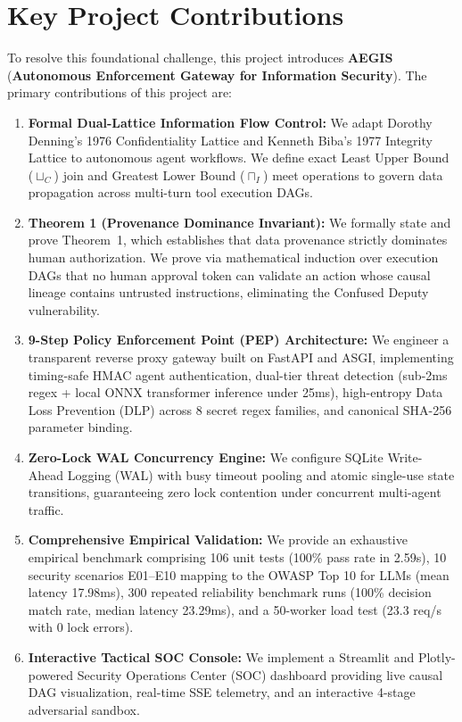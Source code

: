 \section{Key Project Contributions}
To resolve this foundational challenge, this project introduces \textbf{AEGIS} (\textbf{Autonomous Enforcement Gateway for Information Security}). The primary contributions of this project are:
\begin{enumerate}
    \item \textbf{Formal Dual-Lattice Information Flow Control:} We adapt Dorothy Denning's 1976 Confidentiality Lattice \cite{denning1976lattice} and Kenneth Biba's 1977 Integrity Lattice \cite{biba1977integrity} to autonomous agent workflows. We define exact Least Upper Bound ($\sqcup_C$) join and Greatest Lower Bound ($\sqcap_I$) meet operations to govern data propagation across multi-turn tool execution DAGs.
    \item \textbf{Theorem 1 (Provenance Dominance Invariant):} We formally state and prove Theorem~1, which establishes that data provenance strictly dominates human authorization. We prove via mathematical induction over execution DAGs that no human approval token can validate an action whose causal lineage contains untrusted instructions, eliminating the Confused Deputy vulnerability.
    \item \textbf{9-Step Policy Enforcement Point (PEP) Architecture:} We engineer a transparent reverse proxy gateway built on FastAPI and ASGI, implementing timing-safe HMAC agent authentication, dual-tier threat detection (sub-2ms regex + local ONNX transformer inference under 25ms), high-entropy Data Loss Prevention (DLP) across 8 secret regex families, and canonical SHA-256 parameter binding.
    \item \textbf{Zero-Lock WAL Concurrency Engine:} We configure SQLite Write-Ahead Logging (WAL) with busy timeout pooling and atomic single-use state transitions, guaranteeing zero lock contention under concurrent multi-agent traffic.
    \item \textbf{Comprehensive Empirical Validation:} We provide an exhaustive empirical benchmark comprising 106 unit tests (100\% pass rate in 2.59s), 10 security scenarios E01--E10 mapping to the OWASP Top 10 for LLMs (mean latency 17.98ms), 300 repeated reliability benchmark runs (100\% decision match rate, median latency 23.29ms), and a 50-worker load test (23.3 req/s with 0 lock errors).
    \item \textbf{Interactive Tactical SOC Console:} We implement a Streamlit and Plotly-powered Security Operations Center (SOC) dashboard providing live causal DAG visualization, real-time SSE telemetry, and an interactive 4-stage adversarial sandbox.
\end{enumerate}

